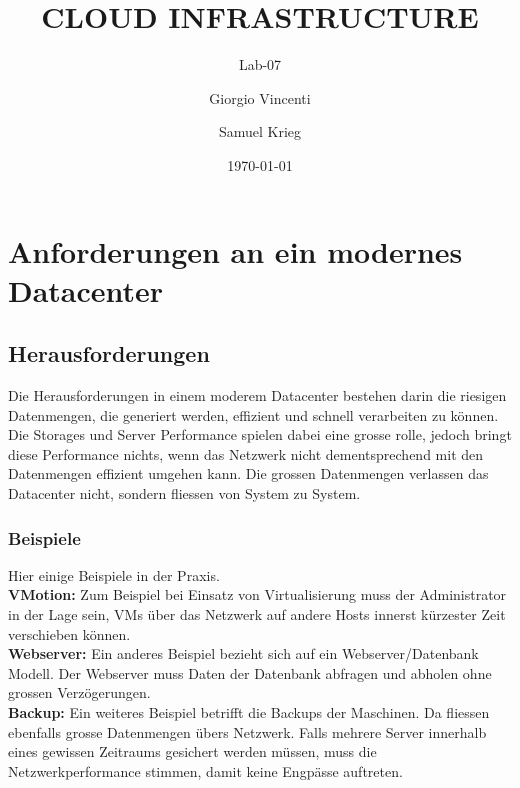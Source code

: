 \documentclass[a4,12pt]{scrartcl}
\title{CLOUD INFRASTRUCTURE}
\subtitle{Lab-07}
\author{Giorgio Vincenti \and Samuel Krieg}
\date{\today}
\begin{document}
\clearpage\maketitle
\thispagestyle{empty}
\tableofcontents
\newpage

\section{Anforderungen an ein modernes Datacenter}
\subsection{Herausforderungen}
Die Herausforderungen in einem moderem Datacenter bestehen darin die riesigen Datenmengen, die generiert werden, effizient und schnell verarbeiten zu können. Die Storages und Server Performance spielen dabei eine grosse rolle, jedoch bringt diese Performance nichts, wenn das Netzwerk nicht dementsprechend mit den Datenmengen effizient umgehen kann. Die grossen Datenmengen verlassen das Datacenter nicht, sondern fliessen von System zu System.

\subsubsection{Beispiele}
Hier einige Beispiele in der Praxis. \\

\noindent \textbf{VMotion:} Zum Beispiel bei Einsatz von Virtualisierung muss der Administrator in der Lage sein, VMs über das Netzwerk auf andere Hosts innerst kürzester Zeit verschieben können. \\

\noindent \textbf{Webserver:} Ein anderes Beispiel bezieht sich auf ein Webserver/Datenbank Modell. Der Webserver muss Daten der Datenbank abfragen und abholen ohne grossen Verzögerungen.\\

\noindent \textbf{Backup:} Ein weiteres Beispiel betrifft die Backups der Maschinen. Da fliessen ebenfalls grosse Datenmengen übers Netzwerk. Falls mehrere Server innerhalb eines gewissen Zeitraums gesichert werden müssen, muss die Netzwerkperformance stimmen, damit keine Engpässe auftreten. 
\end{document}
